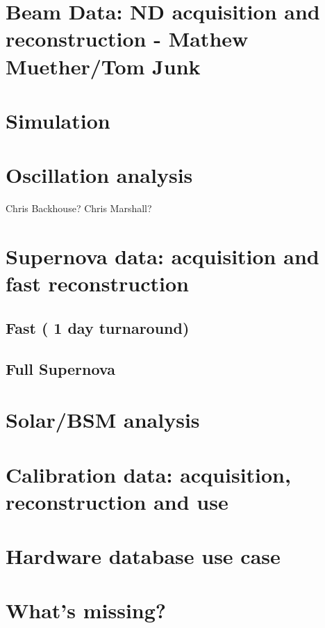\section{Beam Data: ND acquisition and reconstruction - Mathew Muether/Tom Junk}
\label{sec:use:ndbeam}  %

\section{Simulation}   

\section{Oscillation analysis} Chris Backhouse?  Chris Marshall? 
\label{sec:use:osc}

\section{Supernova data: acquisition and fast reconstruction}
\label{sec:use:supernova}  %

\subsection{Fast ( 1 day turnaround)} 

\subsection{Full Supernova}

\section{Solar/BSM analysis}
\label{sec:use:BSManalysis}

\section{Calibration data: acquisition, reconstruction and use}
\label{sec:use:calib}  %

\section{Hardware database use case} 
\label{sec:use:hdb} 

\section{What's missing?}
\label{sec:use:todo}






